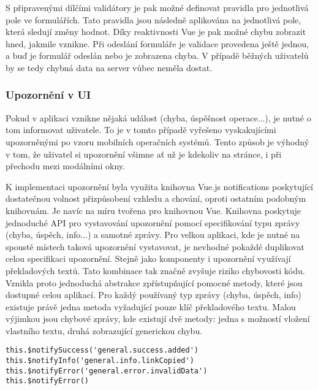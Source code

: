 		S připravenými dílčími validátory je pak možné definovat pravidla pro jednotlivá pole ve formulářích.
		Tato pravidla jsou následně aplikována na jednotlivá pole, která sledují změny hodnot.
		Díky reaktivnosti Vue je pak možné chybu zobrazit hned, jakmile vznikne.
		Při odeslání formuláře je validace provedena ještě jednou, a buď je formulář odeslán nebo je
		zobrazena chyba.
		V případě běžných uživatelů by se tedy chybná data na server vůbec neměla dostat.

		\subsubsection{Upozornění v UI}

		Pokud v aplikaci vznikne nějaká událost (chyba, úspěšnost operace...), je nutné o tom informovat uživatele.
		To je v tomto případě vyřešeno vyskakujícími upozorněnými po vzoru mobilních operačních
		systémů.
		Tento způsob je výhodný v tom, že uživatel si upozornění všimne ať už je kdekoliv na stránce, i
		při přechodu mezi modálními okny.


		K implementaci upozornění byla využita knihovna Vue.js notifications
		poskytující dostatečnou volnost přizpůsobení vzhledu a chování, oproti ostatním podobným knihovnám.
		Je navíc na míru tvořena pro knihovnou Vue.
		Knihovna poskytuje jednoduché \ac{API} pro vystavování upozornění pomocí specifikování typu zprávy (chyba, úspěch, info...) a
		samotné zprávy.
		Pro velkou aplikaci, kde je nutné na spoustě místech taková upozornění vystavovat, je nevhodné pokaždé duplikovat
		celou specifikaci upozornění.
		Stejně jako komponenty i upozornění využívají překladových textů.
		Tato kombinace tak značně zvyšuje riziko chybovosti kódu.
		Vznikla proto jednoduchá abstrakce zpřístupňující pomocné metody, které jsou dostupné celou aplikací.
		Pro každý používaný typ zprávy (chyba, úspěch, info) existuje právě jedna metoda vyžadující pouze klíč překladového textu.
		Malou výjimkou jsou chybové zprávy, kde existují dvě metody: jedna s možností vložení vlastního textu, druhá
		zobrazující generickou chybu.

		\begin{codeblock}
			\begin{verbatim}
this.$notifySuccess('general.success.added')
this.$notifyInfo('general.info.linkCopied')
this.$notifyError('general.error.invalidData')
this.$notifyError()
			\end{verbatim}
		\end{codeblock}

